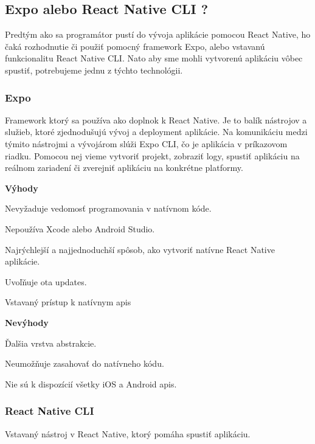 \subsection{Expo alebo React Native CLI ?}
Predtým ako sa programátor pustí do vývoja aplikácie pomocou React Native, ho čaká rozhodnutie či použiť pomocný framework Expo, alebo vstavanú funkcionalitu React Native CLI. Nato aby sme mohli vytvorenú aplikáciu vôbec spustiť, potrebujeme jednu z týchto technológii. \\

\subsubsection{Expo}
Framework ktorý sa používa ako doplnok k React Native. Je to balík nástrojov a služieb, ktoré zjednodušujú vývoj a deployment aplikácie. Na komunikáciu medzi týmito nástrojmi a vývojárom slúži Expo CLI, čo je aplikácia v príkazovom riadku. Pomocou nej vieme vytvoriť projekt, zobraziť logy, spustiť aplikáciu na reálnom zariadení či zverejniť aplikáciu na konkrétne platformy. \cite{expo} \newline

{\bf Výhody}
\begin{itemize}
{\item Nevyžaduje vedomosť programovania v natívnom kóde.}
{\item Nepoužíva Xcode alebo Android Studio.} 
{\item Najrýchlejší a najjednoduchší spôsob, ako vytvoriť natívne React Native aplikácie.}
{\item Uvoľňuje \acrshort{ota} updates.} 
{\item Vstavaný prístup k natívnym \acrshort{api}s} \cite{expo}
\end{itemize}

{\bf Nevýhody}
\begin{itemize}
{\item Ďalšia vrstva abstrakcie.} 
{\item Neumožňuje zasahovať do natívneho kódu.}
{\item Nie sú k dispozícií všetky iOS a Android \acrshort{api}s.} \cite{expo}
\end{itemize}
\bigskip

\subsubsection{React Native CLI}
Vstavaný nástroj v React Native, ktorý pomáha spustiť aplikáciu. \newline

